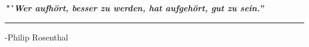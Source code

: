 \cfoot{}

\textit{\textbf{\large "`Wer aufhört, besser zu werden, hat aufgehört, gut zu sein.''}}

\rule[-0.2cm]{1cm}{0pt} {\large -Philip Rosenthal}
